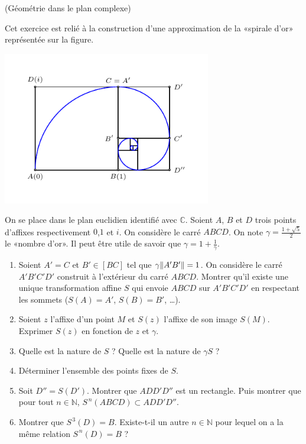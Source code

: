 \documentclass[a4paper,12pt,reqno]{amsart}
\begin{document}
\begin{exo} (Géométrie dans le plan complexe)

  Cet exercice est relié à la construction d'une approximation de la «spirale d'or» représentée sur la figure.

  \vspace{-2\baselineskip}
  \begin{center}
    \includegraphics[width=91mm]{img_spirale_or}
  \end{center}
  \vspace{-\baselineskip}

  On se place dans le plan euclidien identifié avec $\mathbb{C}$. Soient $A$, $B$ et $D$ trois points d'affixes respectivement $0$,$1$ et $i$. On considère le carré $ABCD$. On note $\gamma=\frac{1+\sqrt{5}}{2}$ le «nombre d'or».
  Il peut être utile de savoir que $\gamma=1+\frac{1}{\gamma}$.
  \begin{enumerate}
    \item Soient $A'=C$ et $B' \in [BC]$ tel que $\gamma\|A'B'\|=1$. On considère le carré $A'B'C'D'$ construit à l'extérieur du carré $ABCD$. Montrer qu'il existe une unique transformation affine $S$ qui envoie $ABCD$ sur $A'B'C'D'$ en respectant les sommets ($S(A)=A'$, $S(B)=B'$, \dots).
    \item Soient $z$ l'affixe d'un point $M$ et $S(z)$ l'affixe de son image $S(M)$. Exprimer $S(z)$ en fonction de $z$ et $\gamma$.
    \item Quelle est la nature de $S$ ? Quelle est la nature de $\gamma S$ ?
    \item Déterminer l'ensemble des points fixes de $S$.
    \item Soit $D''=S(D')$. Montrer que $ADD'D''$ est un rectangle. Puis montrer que pour tout $n \in \mathbb{N}$, $S^{\, n}(ABCD) \subset ADD'D''$.
    \item Montrer que $S^{\, 3}(D)=B$.
      Existe-t-il un autre $n \in \mathbb{N}$ pour lequel on a la même relation $S^{\, n}(D)=B$ ?
  \end{enumerate}

\end{exo}
\end{document}
